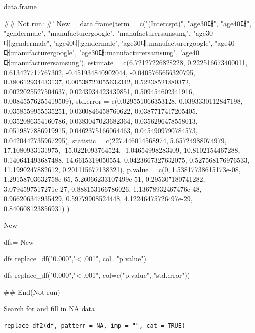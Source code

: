 \documentclass[a4paper]{book}
\begin{document}
%
\begin{Value}
data.frame
\end{Value}
%
\begin{Examples}
\begin{ExampleCode}

\#\# Not run: 
#'
New = data.frame(term = c("(Intercept)", "age30대",
 "age40대", "gendermale", "manufacturergoogle",
 "manufacturersamsung",
 "age30대:gendermale", 'age40대:gendermale',
  'age30대:manufacturergoogle', "age40대:manufacturergoogle",
  "age30대:manufacturersamsung", 'age40대:manufacturersamsung'),
estimate = c(6.72127226828228, 0.222516673400011, 0.613427717767302,
 -0.451934840902044, -0.0405765656320795, 0.380612934433137,
  0.00538723055632342, 0.52238521880372, 0.0022025527504637,
  0.0243934423439851, 0.509454602341916, 0.00845576255419509),
std.error = c(0.029551066353128, 0.0393330112847198,
0.0358559955535251, 0.0300846458760622, 0.0387717417205405,
 0.0352086354160786, 0.0383047023682364, 0.0356296478558013,
 0.0519877886919915, 0.0462375166064463,
 0.0454909790784573, 0.0420442735967295),
statistic = c(227.446014568974, 5.65724988074979,
 17.1080933131975, -15.0221093764524, -1.04654998283409,
 10.8102154467288, 0.140641493687488, 14.6615319050554,
  0.0423667327632075, 0.527568176976533,
   11.1990247882612, 0.201115677138321),
p.value = c(0, 1.53817738615173e-08, 1.29158703632758e-65,
5.26066233107499e-51, 0.295307180741282, 3.0794597517271e-27,
 0.888153166786026, 1.13678932467476e-48,
 0.966206347935429, 0.59779908524448,
 4.12246475726497e-29, 0.840608123856931)
)%

New

dfs= New%

dfs%
  replace_df("0.000","< .001", col="p.value")

dfs%
  replace_df("0.000","< .001", col=c("p.value", "std.error"))



## End(Not run)


\end{ExampleCode}
\end{Examples}
%
\begin{Description}
Search for and fill in NA data
\end{Description}
%
\begin{Usage}
\begin{verbatim}
replace_df2(df, pattern = NA, imp = "", cat = TRUE)
\end{verbatim}
\end{Usage}
\end{document}
